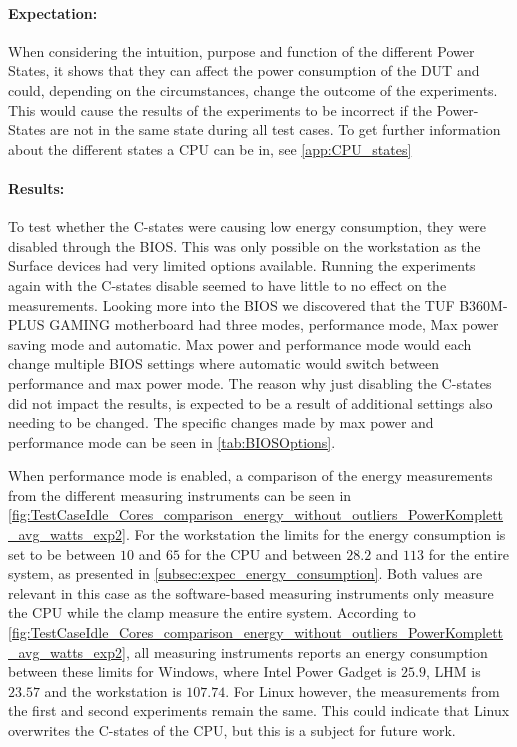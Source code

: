 \paragraph*{Expectation:} When considering the intuition, purpose and function of the different Power States, it shows that they can affect the power consumption of the DUT and could, depending on the circumstances, change the outcome of the experiments. This would cause the results of the experiments to be incorrect if the Power-States are not in the same state during all test cases. To get further information about the different states a CPU can be in, see \cref{app:CPU_states}

\paragraph*{Results:} To test whether the C-states were causing low energy consumption, they were disabled through the  BIOS. This was only possible on the workstation as the Surface devices had very limited options available. Running the experiments again with the C-states disable seemed to have little to no effect on the measurements. Looking more into the BIOS we discovered that the TUF B360M-PLUS GAMING motherboard had three modes, performance mode, Max power saving mode and automatic. Max power and performance mode would each change multiple BIOS settings where automatic would switch between performance and max power mode. The reason why just disabling the C-states did not impact the results, is expected to be a result of additional settings also needing to be changed. The specific changes made by max power and performance mode can be seen in \cref{tab:BIOSOptions}.



When performance mode is enabled, a comparison of the energy measurements from the different measuring instruments can be seen in \cref{fig:TestCaseIdle_Cores_comparison_energy_without_outliers_PowerKomplett_avg_watts_exp2}. For the workstation the limits for the energy consumption is set to be between $10$ and $65$ for the CPU and between $28.2$ and $113$ for the entire system, as presented in \cref{subsec:expec_energy_consumption}. Both values are relevant in this case as the software-based measuring instruments only measure the CPU while the clamp measure the entire system. According to \cref{fig:TestCaseIdle_Cores_comparison_energy_without_outliers_PowerKomplett_avg_watts_exp2}, all measuring instruments reports an energy consumption between these limits for Windows, where Intel Power Gadget is $25.9$, LHM is $23.57$ and the workstation is $107.74$. For Linux however, the measurements from the first and second experiments remain the same. This could indicate that Linux overwrites the C-states of the CPU, but this is a subject for future work.


